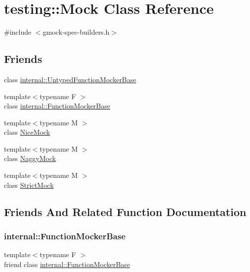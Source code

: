 \hypertarget{classtesting_1_1_mock}{}\section{testing\+:\+:Mock Class Reference}
\label{classtesting_1_1_mock}


{\ttfamily \#include $<$gmock-\/spec-\/builders.\+h$>$}

\subsection*{Friends}
\begin{DoxyCompactItemize}
\item 
class \hyperlink{classtesting_1_1_mock_aa199ba5b2fe114afc42c43912a582feb}{internal\+::\+Untyped\+Function\+Mocker\+Base}
\item 
{\footnotesize template$<$typename F $>$ }\\class \hyperlink{classtesting_1_1_mock_a1945aea400fdb50639e5cdf43c583687}{internal\+::\+Function\+Mocker\+Base}
\item 
{\footnotesize template$<$typename M $>$ }\\class \hyperlink{classtesting_1_1_mock_a9e796f79d4c876398f83aa7678dddc46}{Nice\+Mock}
\item 
{\footnotesize template$<$typename M $>$ }\\class \hyperlink{classtesting_1_1_mock_aee2e427ecb34e6662477add3bb5f8819}{Naggy\+Mock}
\item 
{\footnotesize template$<$typename M $>$ }\\class \hyperlink{classtesting_1_1_mock_a88b3d71476c27b82c88bd49e8297e20e}{Strict\+Mock}
\end{DoxyCompactItemize}


\subsection{Friends And Related Function Documentation}
\mbox{\label{classtesting_1_1_mock_a1945aea400fdb50639e5cdf43c583687}} 
\subsubsection{\texorpdfstring{internal\+::\+Function\+Mocker\+Base}{internal::FunctionMockerBase}}
{\footnotesize\ttfamily template$<$typename F $>$ \\
friend class \hyperlink{classtesting_1_1internal_1_1_function_mocker_base}{internal\+::\+Function\+Mocker\+Base}\hspace{0.3cm}{\ttfamily [friend]}}

